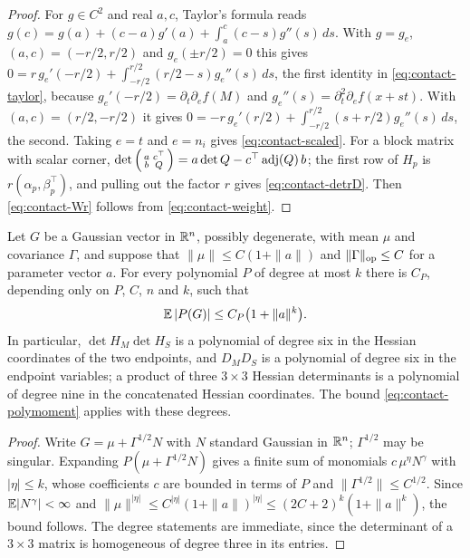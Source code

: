 \begin{proof}
For $g\in C^2$ and real $a,c$, Taylor's formula reads $g(c)=g(a)+(c-a)g'(a)+\int_a^c(c-s)g''(s)\,ds$. With $g=g_e$, $(a,c)=(-r/2,r/2)$ and $g_e(\pm r/2)=0$ this gives $0=r\,g_e'(-r/2)+\int_{-r/2}^{r/2}(r/2-s)g_e''(s)\,ds$, the first identity in \eqref{eq:contact-taylor}, because $g_e'(-r/2)=\partial_t\partial_ef(M)$ and $g_e''(s)=\partial_t^2\partial_ef(x+st)$. With $(a,c)=(r/2,-r/2)$ it gives $0=-r\,g_e'(r/2)+\int_{-r/2}^{r/2}(s+r/2)g_e''(s)\,ds$, the second. Taking $e=t$ and $e=n_i$ gives \eqref{eq:contact-scaled}. For a block matrix with scalar corner, $\det\left(\begin{smallmatrix}a&c^{\top}\\ b&Q\end{smallmatrix}\right)=a\det Q-c^{\top}\operatorname{adj}(Q)\,b$; the first row of $H_p$ is $r(\alpha_p,\beta_p^{\top})$, and pulling out the factor $r$ gives \eqref{eq:contact-detrD}. Then \eqref{eq:contact-Wr} follows from \eqref{eq:contact-weight}.
\end{proof}

\begin{lemma}\label{lem:contact-moments}
Let $G$ be a Gaussian vector in $\mathbb R^n$, possibly degenerate, with mean $\mu$ and covariance $\Gamma$, and suppose that $\|\mu\|\le C(1+\|a\|)$ and $\|\Gamma\|_{\rm op}\le C$ for a parameter vector $a$. For every polynomial $P$ of degree at most $k$ there is $C_P$, depending only on $P$, $C$, $n$ and $k$, such that
\begin{equation}\label{eq:contact-polymoment}
\mathbb E\,|P(G)|\le C_P\bigl(1+\|a\|^k\bigr).
\end{equation}
In particular, $\det H_M\det H_S$ is a polynomial of degree six in the Hessian coordinates of the two endpoints, and $D_MD_S$ is a polynomial of degree six in the endpoint variables; a product of three $3\times3$ Hessian determinants is a polynomial of degree nine in the concatenated Hessian coordinates. The bound \eqref{eq:contact-polymoment} applies with these degrees.
\end{lemma}

\begin{proof}
Write $G=\mu+\Gamma^{1/2}N$ with $N$ standard Gaussian in $\mathbb R^n$; $\Gamma^{1/2}$ may be singular. Expanding $P(\mu+\Gamma^{1/2}N)$ gives a finite sum of monomials $c\,\mu^\eta N^\gamma$ with $|\eta|\le k$, whose coefficients $c$ are bounded in terms of $P$ and $\|\Gamma^{1/2}\|\le C^{1/2}$. Since $\mathbb E|N^\gamma|<\infty$ and $\|\mu\|^{|\eta|}\le C^{|\eta|}(1+\|a\|)^{|\eta|}\le(2C+2)^k(1+\|a\|^k)$, the bound follows. The degree statements are immediate, since the determinant of a $3\times3$ matrix is homogeneous of degree three in its entries.
\end{proof}

